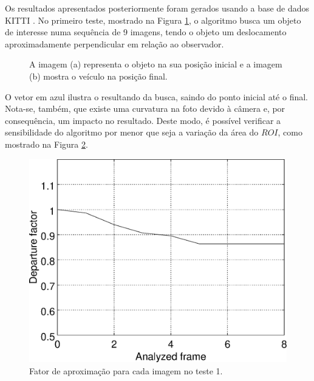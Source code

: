 
Os resultados apresentados posteriormente foram gerados usando a base de dados KITTI \cite{Geiger}.
No primeiro teste, mostrado na Figura \ref{fig:imgpapercerta}, o algoritmo busca um objeto 
de interesse numa sequência de
9 imagens, tendo o objeto um deslocamento aproximadamente perpendicular em relação ao observador.
\begin{figure}[!hbt]
\centering
  \caption{A imagem (a) representa o objeto na sua posição inicial 
   e a imagem (b) mostra o veículo na posição final.}
  \label{fig:imgpapercerta}
\end{figure}

O vetor em azul ilustra o resultando da busca, saindo do ponto inicial até o final. 
Nota-se, também, que existe uma curvatura na foto devido à câmera e, por consequência,
um impacto no resultado. Deste modo, é possível verificar a sensibilidade do algoritmo 
por menor que seja a variação da área do $ROI$, como mostrado na Figura \ref{fig:res_graph1}.

\begin{figure}[!hbt]
\centering
\includegraphics[width=0.8\columnwidth]{images/graph1.eps}
\caption{Fator de aproximação para cada imagem no teste 1.}
\label{fig:res_graph1}
\end{figure}

